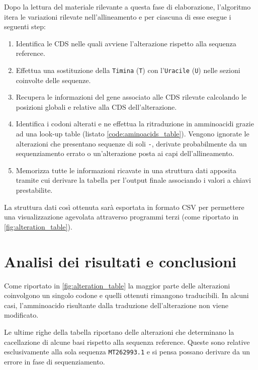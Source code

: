 \documentclass[11pt,italian]{article}
\begin{document}
\noindent
Dopo la lettura del materiale rilevante a questa fase di elaborazione, l'algoritmo itera le variazioni rilevate nell'allineamento e per ciascuna di esse esegue i seguenti step:
\begin{enumerate}
  \item Identifica le CDS nelle quali avviene l'alterazione rispetto alla sequenza reference.
  \item Effettua una sostituzione della \lstinline{Timina} (\lstinline{T}) con l'\lstinline{Uracile} (\lstinline{U}) nelle sezioni coinvolte delle sequenze.
  \item Recupera le informazioni del gene associato alle CDS rilevate calcolando le posizioni globali e relative alla CDS dell'alterazione.
  \item Identifica i codoni alterati e ne effettua la ritraduzione in amminoacidi grazie ad una look-up table (listato \ref{code:aminoacids_table}). Vengono ignorate le alterazioni che presentano sequenze di soli \lstinline{-}, derivate probabilmente da un sequenziamento errato o un'alterazione posta ai capi dell'allineamento.
  \item Memorizza tutte le informazioni ricavate in una struttura dati apposita tramite cui derivare la tabella per l'output finale associando i valori a chiavi prestabilite.
\end{enumerate}

\noindent
La struttura dati così ottenuta sarà esportata in formato CSV per permettere una visualizzazione agevolata attraverso programmi terzi (come riportato in \cref{fig:alteration_table}).

\newpage
\section{Analisi dei risultati e conclusioni}
Come riportato in \cref{fig:alteration_table} la maggior parte delle alterazioni coinvolgono un singolo codone e quelli ottenuti rimangono traducibili. In alcuni casi, l'amminoacido risultante dalla traduzione dell'alterazione non viene modificato.

Le ultime righe della tabella riportano delle alterazioni che determinano la cacellazione di alcune basi rispetto alla sequenza reference.
Queste sono relative esclusivamente alla sola sequenza \lstinline{MT262993.1} e si pensa possano derivare da un errore in fase di sequenziamento.
\end{document}
